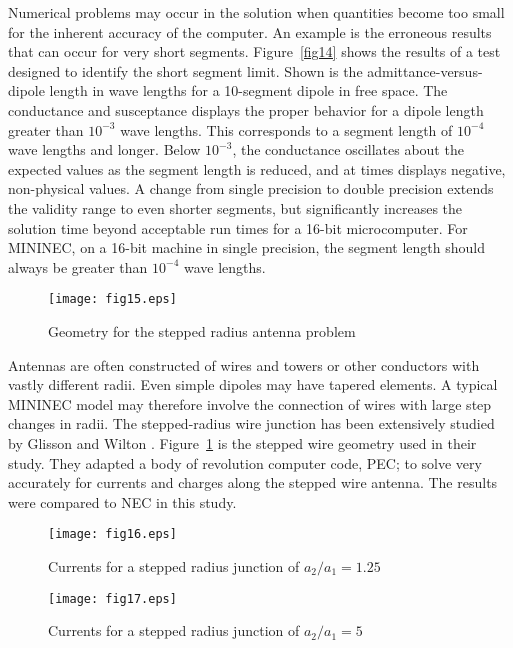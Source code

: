 \documentclass[12pt]{article}
\begin{document}
Numerical problems may occur in the solution when quantities become too
small for the inherent accuracy of the computer. An example is the
erroneous results that can occur for very short segments.
Figure~\ref{fig14} shows the results of a test designed to identify the
short segment limit. Shown is the admittance-versus-dipole length in wave
lengths for a 10-segment dipole in free space. The conductance and
susceptance displays the proper behavior for a dipole length greater
than $10^{-3}$ wave lengths. This corresponds to a segment length of
$10^{-4}$ wave lengths and longer. Below $10^{-3}$, the conductance
oscillates about the expected values as the segment length is reduced,
and at times displays negative, non-physical values. A change from
single precision to double precision extends the validity range to even
shorter segments, but significantly increases the solution time beyond
acceptable run times for a 16-bit microcomputer. For MININEC, on a
16-bit machine in single precision, the segment length should always be
greater than $10^{-4}$ wave lengths.

\begin{figure}[t]
\centerline{\texttt{[image: fig15.eps]}}
\caption{Geometry for the stepped radius antenna problem}
\label{fig15}
\end{figure}

Antennas are often constructed of wires and towers or other conductors
with vastly different radii. Even simple dipoles may have tapered
elements. A typical MININEC model may therefore involve the connection
of wires with large step changes in radii. The stepped-radius wire
junction has been extensively studied by Glisson and Wilton
\cite{r17}. Figure~\ref{fig15} is the stepped wire geometry
used in their study. They adapted a body of revolution computer code,
PEC; to solve very accurately for currents and charges along the stepped
wire antenna. The results were compared to NEC in this study.

\begin{sidewaysfigure}[htb]
\centerline{\texttt{[image: fig16.eps]}}
\caption{Currents for a stepped radius junction of $a_2/a_1 = 1.25$}
\label{fig16}
\end{sidewaysfigure}

\begin{sidewaysfigure}[htb]
\centerline{\texttt{[image: fig17.eps]}}
\caption{Currents for a stepped radius junction of $a_2/a_1 = 5$}
\label{fig17}
\end{sidewaysfigure}
\end{document}
